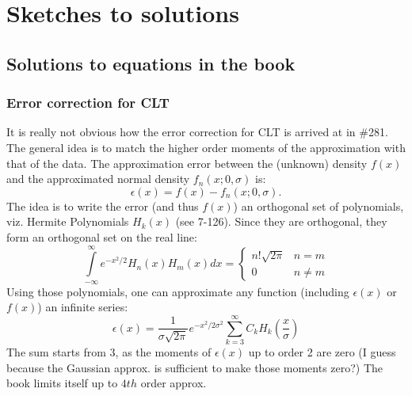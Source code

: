 \documentclass[a4paper, oneside]{book}
\begin{document}
\chapter*{Sketches to solutions}
\section{Solutions to equations in the book}

\subsection{Error correction for CLT}
\label{sec:error_correction}
It is really not obvious how the error correction for CLT is arrived at in \#281. The general idea is to match the higher order moments of the approximation with that of the data. The approximation error between the (unknown) density $f(x)$ and the approximated normal density $f_n(x; 0, \sigma)$ is:
%
\begin{equation}
\epsilon(x) = f(x)-f_n(x; 0, \sigma).
\end{equation}
%
The idea is to write the error (and thus $f(x)$) \ito an orthogonal set of polynomials, viz. Hermite Polynomials $H_k(x)$ (see 7-126). Since they are orthogonal, they form an orthogonal set on the real line:
%
\begin{equation}
\int\limits_{-\infty}^\infty e^{-x^2/2} H_n(x) H_m(x) dx = \begin{cases}n!\sqrt{2\pi}&n=m\\0&n\neq m\end{cases}
\label{eq:h_orth}
\end{equation}
%
Using those polynomials, one can approximate any function (including $\epsilon(x)$ or $f(x)$) \ito an infinite series:
%
\begin{equation}
\epsilon(x) = \frac{1}{\sigma \sqrt{2\pi}}e^{-x^2/2\sigma^2}\sum\limits_{k=3}^\infty C_k H_k\left(\frac{x}{\sigma}\right)
\end{equation}
%
The sum starts from $3$, as the moments of $\epsilon(x)$ up to order 2 are zero (I guess because the Gaussian approx. is sufficient to make those moments zero?) The book limits itself up to $4th$ order approx.
\end{document}
